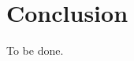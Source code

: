 \documentclass[]{final_report}
\theoremstyle{definition}
\begin{document}

\chapter{Conclusion}
To be done.



\newpage

\printbibliography
\label{endpage}
\end{document}
